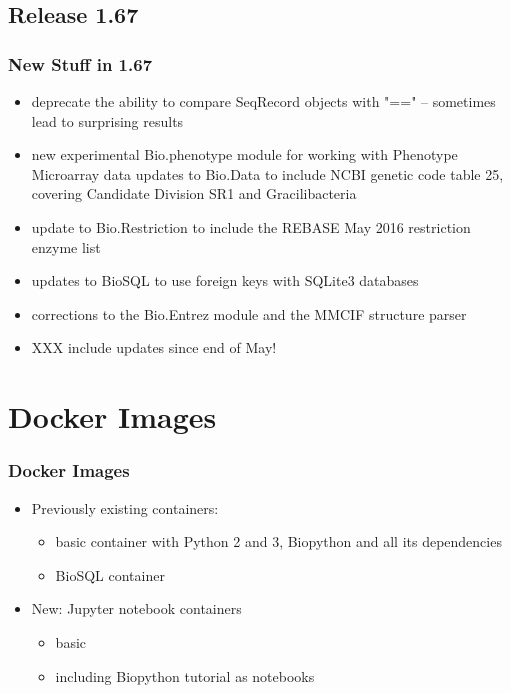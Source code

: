 \documentclass[trans]{beamer}
\begin{document}
\subsection*{Release 1.67}
\frame
{
  \frametitle{New Stuff in 1.67}

  \begin{itemize}
  \item deprecate the ability to compare SeqRecord objects with "==" -- sometimes lead to surprising results
  \item new experimental Bio.phenotype module for working with Phenotype Microarray data updates to Bio.Data to include NCBI genetic code table 25, covering Candidate Division SR1 and Gracilibacteria
  \item update to Bio.Restriction to include the REBASE May 2016 restriction enzyme list
  \item updates to BioSQL to use foreign keys with SQLite3 databases
  \item corrections to the Bio.Entrez module and the MMCIF structure parser
  \item XXX include updates since end of May!
  \end{itemize}
}


\section{Docker Images}
\frame
{
  \frametitle{Docker Images}

  \begin{itemize}
  \item Previously existing containers:
    \begin{itemize}
    \item basic container with Python 2 and 3, Biopython and all its dependencies
    \item BioSQL container
  \end{itemize}
  \item New: Jupyter notebook containers
    \begin{itemize}
      \item basic
      \item including Biopython tutorial as notebooks
    \end{itemize}
  \end{itemize}
}

\end{document}
